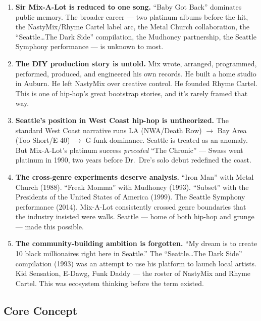 \documentclass[11pt,letterpaper]{article}
\begin{document}
\begin{enumerate}[leftmargin=2em]
\item \textbf{Sir Mix-A-Lot is reduced to one song.} ``Baby Got Back'' dominates public memory. The broader career --- two platinum albums before the hit, the NastyMix/Rhyme Cartel label arc, the Metal Church collaboration, the ``Seattle\ldots The Dark Side'' compilation, the Mudhoney partnership, the Seattle Symphony performance --- is unknown to most.

\item \textbf{The DIY production story is untold.} Mix wrote, arranged, programmed, performed, produced, and engineered his own records. He built a home studio in Auburn. He left NastyMix over creative control. He founded Rhyme Cartel. This is one of hip-hop's great bootstrap stories, and it's rarely framed that way.

\item \textbf{Seattle's position in West Coast hip-hop is untheorized.} The standard West Coast narrative runs LA (NWA/Death Row) $\rightarrow$ Bay Area (Too Short/E-40) $\rightarrow$ G-funk dominance. Seattle is treated as an anomaly. But Mix-A-Lot's platinum success \textit{preceded} ``The Chronic'' --- Swass went platinum in 1990, two years before Dr.~Dre's solo debut redefined the coast.

\item \textbf{The cross-genre experiments deserve analysis.} ``Iron Man'' with Metal Church (1988). ``Freak Momma'' with Mudhoney (1993). ``Subset'' with the Presidents of the United States of America (1999). The Seattle Symphony performance (2014). Mix-A-Lot consistently crossed genre boundaries that the industry insisted were walls. Seattle --- home of both hip-hop and grunge --- made this possible.

\item \textbf{The community-building ambition is forgotten.} ``My dream is to create 10 black millionaires right here in Seattle.'' The ``Seattle\ldots The Dark Side'' compilation (1993) was an attempt to use his platform to launch local artists. Kid Sensation, E-Dawg, Funk Daddy --- the roster of NastyMix and Rhyme Cartel. This was ecosystem thinking before the term existed.
\end{enumerate}

\subsection{Core Concept}
\end{document}
